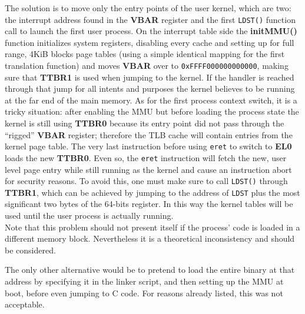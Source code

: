 \documentclass[12pt,a4paper,openright,twoside]{report}
\begin{document}
The solution is to move only the entry points of the user kernel, which are
two: the interrupt address found in the \textbf{VBAR} register and the first
{\tt LDST()} function call to launch the first user process. 
On the interrupt table side the \textbf{initMMU()} function
initializes system registers, disabling every cache and setting up for full
range, 4KiB blocks page tables (using a simple identical mapping for the first
translation function) and moves \textbf{VBAR} over to {\tt 0xFFFF000000000000},
making sure that \textbf{TTBR1} is used when jumping to the kernel. If the handler
is reached through that jump for all intents and purposes the kernel believes to 
be running at the far end of the main memory.
As for the first process context switch, it is a tricky situation: after enabling
the MMU but before loading the process state the kernel is still using \textbf{TTBR0}
because its entry point did not pass through the ``rigged'' \textbf{VBAR} register;
therefore the TLB cache will contain entries from the kernel page table.
The very last instruction before using {\tt eret} to switch to \textbf{EL0} loads
the new \textbf{TTBR0}. Even so, the {\tt eret} instruction will fetch the
new, user level page entry while still running as the kernel and
 cause an instruction abort for security reasons.
To avoid this, one must make sure to call {\tt LDST()} through \textbf{TTBR1},
which can be achieved by jumping to the address of {\tt LDST} plus the most significant
two bytes of the 64-bits register. In this way the kernel tables will be used 
until the user process is actually running.\\
Note that this problem should not present itself if the process' code is loaded
in a different memory block. Nevertheless it is a theoretical inconsistency and
should be considered.

The only other alternative would be to pretend to load the entire binary at that
address by specifying it in the linker script, and then setting up the MMU at 
boot, before even jumping to C code. For reasons already listed, this was not
acceptable.
\newpage
\end{document}
